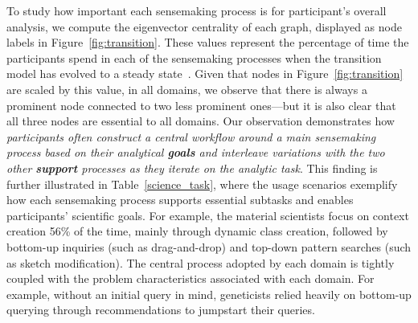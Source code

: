  \par To study how important each sensemaking process
 is for participant's overall analysis,
 we compute the eigenvector centrality of each graph,
 displayed as node labels in Figure~\ref{fig:transition}.
 These values represent the percentage of time the participants
 spend in each of the sensemaking processes
 when the transition model has evolved to a steady state~\cite{pierre2011}.
 Given that nodes in Figure~\ref{fig:transition}
 are scaled by this value, in all domains,
 we observe that there is always a prominent node
 connected to two less prominent ones---but it is also clear
 that all three nodes are essential to all domains.
 Our observation demonstrates how \emph{participants
 often construct a central workflow
 around a main sensemaking process based on their analytical \textbf{goals}
 and interleave variations with the two other \textbf{support} processes as they iterate on the analytic task}. This finding is further illustrated in Table~\ref{science_task}, where the usage scenarios exemplify how each sensemaking process supports essential subtasks and enables participants' scientific goals. For example, the material scientists focus on context creation 56\% of the time, mainly through dynamic class creation, followed by bottom-up inquiries (such as drag-and-drop) and top-down pattern searches (such as sketch modification).
 The central process adopted by each domain
 is tightly coupled with the problem characteristics associated with each domain. For example, without an initial query in mind,
 geneticists relied heavily on bottom-up querying
 through recommendations to jumpstart their queries.
